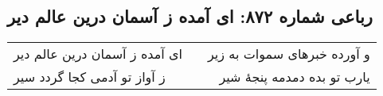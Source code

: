 \begin{center}
\section*{رباعی شماره ۸۷۲: ای آمده ز آسمان درین عالم دیر}
\label{sec:0872}
\begin{longtable}{l p{0.5cm} r}
ای آمده ز آسمان درین عالم دیر
&&
و آورده خبرهای سموات به زیر
\\
ز آواز تو آدمی کجا گردد سیر
&&
یارب تو بده دمدمه پنجهٔ شیر
\\
\end{longtable}
\end{center}
